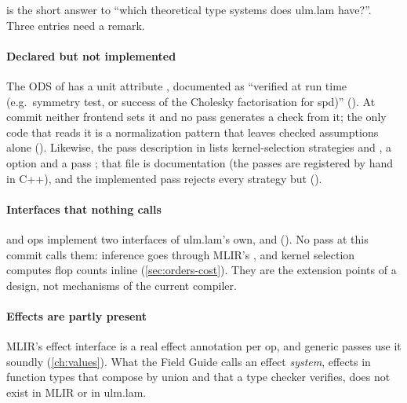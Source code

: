  is the short answer to ``which theoretical type
systems does ulm.lam have?''. Three entries need a remark.

\paragraph{Declared but not implemented} The ODS of 
has a unit attribute , documented as ``verified at run time
(e.g.\ symmetry test, or success of the Cholesky factorisation for spd)''
(). At commit
\texttt{\shortcommit} neither frontend sets it and no pass generates a
check from it; the only code that reads it is a normalization pattern that
leaves checked assumptions alone
(). Likewise, the pass description in
 lists kernel-selection strategies
 and , a  option and a pass
; that file is documentation (the passes
are registered by hand in C++), and the implemented pass rejects every
strategy but  ().

\paragraph{Interfaces that nothing calls}  and
 ops implement two interfaces of ulm.lam's own,
 and 
(). No pass at this
commit calls them: inference goes through MLIR's
, and kernel selection computes flop counts
inline (\cref{sec:orders-cost}). They are the extension points of a design,
not mechanisms of the current compiler.

\paragraph{Effects are partly present} MLIR's effect interface is a real
effect annotation per op, and generic passes use it soundly
(\cref{ch:values}). What the Field Guide calls an effect \emph{system},
effects in function types that compose by union and that a type checker
verifies, does not exist in MLIR or in ulm.lam.
